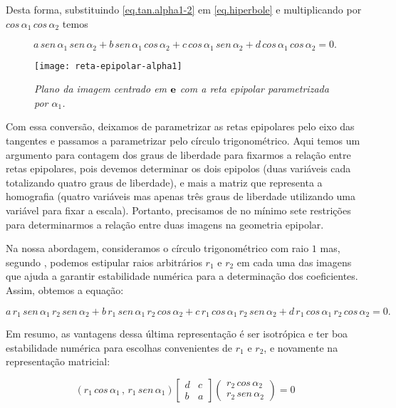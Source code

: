Desta forma, substituindo \ref{eq.tan.alpha1-2} em \ref{eq.hiperbole} e multiplicando por $cos\,\alpha_1\,cos\,\alpha_2$ temos

\begin{equation*}
a\,sen\,\alpha_1\,sen\,\alpha_2+b\,sen\,\alpha_1\,cos\,\alpha_2+c\,cos\,\alpha_1\,sen\,\alpha_2+d\,cos\,\alpha_1\,cos\,\alpha_2=0.
\end{equation*}

\begin{figure}[!htb]
\centering
\texttt{[image: reta-epipolar-alpha1]}
\caption{\textit{Plano da imagem centrado em ${\bf e}$ com a reta epipolar parametrizada por $\alpha_1$.}}
\label{fig.reta-epipolar}
\end{figure}

Com essa conversão, deixamos de parametrizar as retas epipolares pelo eixo das tangentes e passamos a parametrizar pelo círculo trigonométrico. Aqui temos um argumento para contagem dos graus de liberdade para fixarmos a relação entre retas epipolares, pois devemos determinar os dois epipolos (duas variáveis cada totalizando quatro graus de liberdade), e mais a matriz que representa a homografia (quatro variáveis mas apenas três graus de liberdade utilizando uma variável para fixar a escala). Portanto, precisamos de no mínimo sete restrições para determinarmos a relação entre duas imagens na geometria epipolar. 

Na nossa abordagem, consideramos o círculo trigonométrico com raio $1$ mas, segundo \cite{Fabbri:Kimia:CVPR10}, podemos estipular raios arbitrários $r_1$ e $r_2$ em cada uma das imagens que ajuda a garantir estabilidade numérica para a determinação dos coeficientes. Assim, obtemos a equação:

\begin{equation*}
a\,r_1\,sen\,\alpha_1\,r_2\,sen\,\alpha_2+b\,r_1\,sen\,\alpha_1\,r_2\,cos\,\alpha_2+c\,r_1\,cos\,\alpha_1\,r_2\,sen\,\alpha_2+d\,r_1\,cos\,\alpha_1\,r_2\,cos\,\alpha_2=0.
\end{equation*}

Em resumo, as vantagens dessa última representação é ser isotrópica e ter boa estabilidade numérica para escolhas convenientes de $r_1$ e $r_2$, e novamente  na representação matricial:

\begin{equation*}
(r_1\,cos\,\alpha_1\,,\,r_1\,sen\,\alpha_1)
\begin{bmatrix}
d&c\\
b&a
\end{bmatrix}
\begin{pmatrix}
r_2\,cos\,\alpha_2\\
r_2\,sen\,\alpha_2
\end{pmatrix}
=0
\end{equation*}


